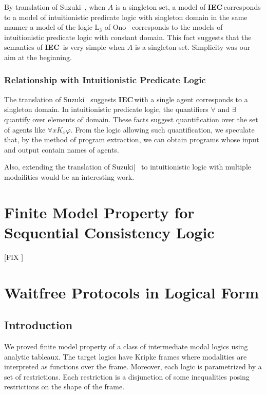 \documentclass[doctor]{iscs-thesis}
\newcommand{\iec}{{\rm {\textbf{IEC}}}}
\newcommand{\fix}[1]{[FIX \fbox{#1}]}
\begin{document}
By translation of Suzuki~\cite{suzuki1990kripke},
when $A$ is a singleton set, a model of \iec\,corresponds to 
a model of intuitionistic predicate logic with singleton domain
in the same manner a model of the logic 
$\mathrm L_3$ of Ono~\cite{hiroakira-some} corresponds to the models of
intuitionistic predicate logic with constant domain.
This fact suggests that the semantics of \iec\, is very simple when $A$ is a singleton set.
Simplicity was our aim at the beginning.

\subsection{Relationship with Intuitionistic Predicate Logic}

The translation of Suzuki~\cite{suzuki1990kripke} suggests
\iec\,with
a single agent corresponds to a singleton domain.
In intuitionistic predicate logic, the quantifiers $\forall$ and $\exists$ quantify over
elements of domain.
These facts suggest
quantification over the set of agents like $\forall x K_x\varphi$.
From the logic allowing such quantification,
we speculate that, by the method of program extraction,
we can obtain programs whose input and output contain names of agents.

Also, extending the translation of Suzuki|~\cite{suzuki1990kripke} to intuitionistic logic
with multiple modailities would be an interesting work.


\chapter{Finite Model Property for Sequential Consistency Logic}

\fix{just put NASSLLI paper here.}

\chapter{Waitfree Protocols in Logical Form}


\section{Introduction}

We proved finite model property of a class of intermediate modal logics
using analytic tableaux.
The target logics have Kripke frames where modalities are interpreted as
functions over the frame.  Moreover, each logic is parametrized by a
set of restrictions.  Each restriction is a disjunction of some
inequalities posing restrictions on the shape of the frame.
\end{document}
